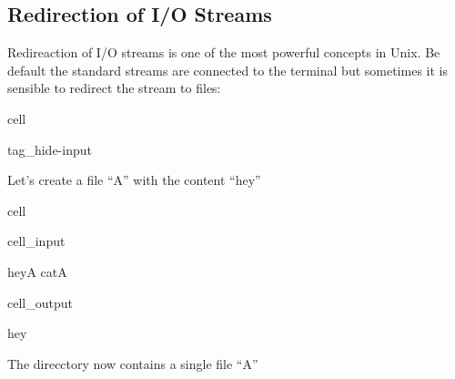 \documentclass[a4paper,10pt,english]{jupyterBook}
\begin{document}
\subsection{Redirection of I/O Streams}
\label{\detokenize{text/progtut/unixstreams:redirection-of-i-o-streams}}
\sphinxAtStartPar
Redireaction of I/O streams is one of the most powerful  concepts in Unix.
Be default the standard streams are connected to the terminal but sometimes it is sensible to redirect the stream to files:

\begin{sphinxuseclass}{cell}
\begin{sphinxuseclass}{tag_hide-input}
\end{sphinxuseclass}
\end{sphinxuseclass}
\sphinxAtStartPar
Let’s create a file “A” with the content “hey”

\begin{sphinxuseclass}{cell}\begin{sphinxVerbatimInput}

\begin{sphinxuseclass}{cell_input}
\begin{sphinxVerbatim}[commandchars=\\\{\}]
hey\PYGZgt{}A
catA
\end{sphinxVerbatim}

\end{sphinxuseclass}\end{sphinxVerbatimInput}
\begin{sphinxVerbatimOutput}

\begin{sphinxuseclass}{cell_output}
\begin{sphinxVerbatim}[commandchars=\\\{\}]
hey
\end{sphinxVerbatim}

\end{sphinxuseclass}\end{sphinxVerbatimOutput}

\end{sphinxuseclass}
\sphinxAtStartPar
The direcctory now contains a single file “A”
\end{document}
